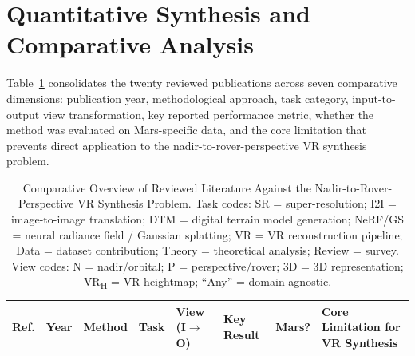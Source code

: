 \documentclass[10pt,journal]{IEEEtran}
\begin{document}
\section{Quantitative Synthesis and Comparative Analysis}
\label{sec:synthesis}

Table~\ref{tab:comparison} consolidates the twenty reviewed publications across
seven comparative dimensions: publication year, methodological approach, task
category, input-to-output view transformation, key reported performance metric,
whether the method was evaluated on Mars-specific data, and the core limitation
that prevents direct application to the nadir-to-rover-perspective VR synthesis
problem.

\begin{table}[!t]
\caption{Comparative Overview of Reviewed Literature Against the Nadir-to-Rover-Perspective VR Synthesis Problem.
  Task codes: SR = super-resolution; I2I = image-to-image translation;
  DTM = digital terrain model generation; NeRF/GS = neural radiance field / Gaussian splatting;
  VR = VR reconstruction pipeline; Data = dataset contribution; Theory = theoretical analysis;
  Review = survey. View codes: N = nadir/orbital; P = perspective/rover; 3D = 3D representation;
  VR\textsubscript{H} = VR heightmap; ``Any'' = domain-agnostic.}
\label{tab:comparison}
\centering
\footnotesize
\setlength{\tabcolsep}{4pt}
\renewcommand{\arraystretch}{1.15}
\begin{tabular}{@{}p{0.45cm}lp{2.0cm}p{0.85cm}p{1.15cm}p{3.4cm}lp{4.4cm}@{}}
\toprule
\textbf{Ref.} & \textbf{Year} & \textbf{Method} & \textbf{Task} &
\textbf{View (I$\to$O)} & \textbf{Key Result} & \textbf{Mars?} &
\textbf{Core Limitation for VR Synthesis} \\
\midrule


\end{tabular}
\end{table}
\end{document}
